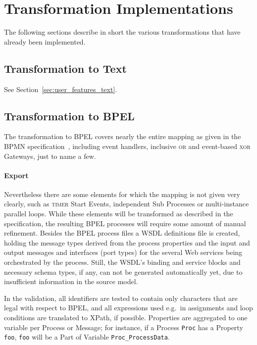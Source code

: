 
\section{Transformation Implementations}

The following sections describe in short the various transformations that have
already been implemented.


\subsection{Transformation to Text}

See Section~\ref{sec:user_features_text}.


\subsection{Transformation to BPEL}
\label{sec:user_trafo_bpel}

The transformation to BPEL covers nearly the entire mapping as given in the BPMN
specification~\cite[Appendix A]{omg2011bpmn2}, including event handlers, inclusive
\textsc{or} and event-based \textsc{xor} Gateways, just to name a few.

\paragraph{Export}
Nevertheless there are some elements for which the mapping is not given very
clearly, such as \textsc{timer} Start Events, independent Sub Processes or
multi-instance parallel loops.  While these elements will be transformed as
described in the specification, the resulting BPEL processes will require some
amount of manual refinement.  Besides the BPEL process files a WSDL definitions
file is created, holding the message types derived from the process properties
and the input and output messages and interfaces (port types) for the several Web
services being orchestrated by the process.  Still, the WSDL's binding and service
blocks and necessary schema types, if any, can not be generated automatically
yet, due to insufficient information in the source model.

In the validation, all identifiers are tested to contain only characters that are
legal with respect to BPEL, and all expressions used e.g.\ in assignments and
loop conditions are translated to XPath, if possible.  Properties are aggregated
to one variable per Process or Message; for instance, if a Process \texttt{Proc}
has a Property \texttt{foo}, \texttt{foo} will be a Part of Variable
\texttt{Proc\_ProcessData}.

